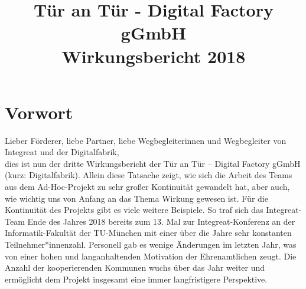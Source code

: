 \documentclass[12pt, a4paper]{article} %
\begin{document}
\title{
Tür an Tür - Digital Factory gGmbH\\
Wirkungsbericht 2018\\
} %

\AddToShipoutPicture*{\BackgroundPic}

\date{}

\maketitle
\thispagestyle{empty} %



\newpage
\tableofcontents

\newpage

\hypertarget{vorwort}{%
\section{Vorwort}\label{vorwort}}

Lieber Förderer, liebe Partner, liebe Wegbegleiterinnen und Wegbegleiter
von Integreat und der Digitalfabrik,
\\

dies ist nun der dritte Wirkungsbericht der Tür an Tür – Digital Factory
gGmbH (kurz: Digitalfabrik). Allein diese Tatsache zeigt, wie sich die
Arbeit des Teams aus dem Ad-Hoc-Projekt zu sehr großer Kontinuität
gewandelt hat, aber auch, wie wichtig uns von Anfang an das Thema
Wirkung gewesen ist. Für die Kontinuität des Projekts gibt es viele
weitere Beispiele. So traf sich das Integreat-Team Ende des Jahres 2018
bereits zum 13. Mal zur Integreat-Konferenz an der Informatik-Fakultät
der TU-München mit einer über die Jahre sehr konstanten
Teilnehmer*innenzahl. Personell gab es wenige Änderungen im letzten
Jahr, was von einer hohen und langanhaltenden Motivation der
Ehrenamtlichen zeugt. Die Anzahl der kooperierenden Kommunen wuchs über
das Jahr weiter und ermöglicht dem Projekt insgesamt eine immer
langfristigere Perspektive.
\end{document}
